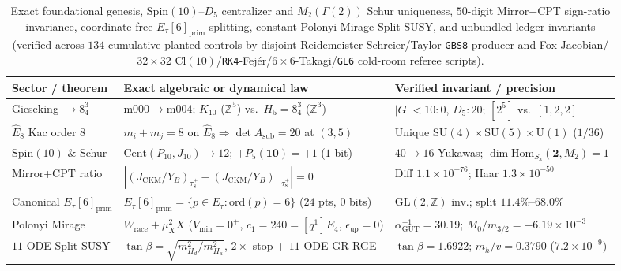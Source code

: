 \documentclass[aps,prd,twocolumn,nofootinbib,floatfix]{revtex4-2}
\begin{document}
\begin{table}[t]
\caption{Exact foundational genesis, $\mathrm{Spin}(10)$--$D_5$ centralizer and $M_2(\Gamma(2))$ Schur uniqueness, $50$-digit Mirror+CPT sign-ratio invariance, coordinate-free $E_\tau[6]_{\mathrm{prim}}$ splitting, constant-Polonyi Mirage Split-SUSY, and unbundled ledger invariants (verified across $134$ cumulative planted controls by disjoint Reidemeister-Schreier/Taylor-\texttt{GBS8} producer and Fox-Jacobian/$32\times 32$ $\mathrm{Cl}(10)$/\texttt{RK4}-Fej\'er/$6\times 6$-Takagi/\texttt{GL6} cold-room referee scripts).}
\label{tab:foundations_link7}
\begin{ruledtabular}
\begin{tabular}{lll}
Sector / theorem & Exact algebraic or dynamical law & Verified invariant / precision \\
\hline
Gieseking $\to 8^3_4$ & $\mathrm{m000}\to\mathrm{m004}$; $K_{10}$ ($\mathbb{Z}^5$) vs.\ $H_5=8^3_4$ ($\mathbb{Z}^3$) & $|G|<10: 0$, $D_5: 20$; $[2^5]$ vs.\ $[1,2,2]$ \\
$\widehat{E}_8$ Kac order $8$ & $m_i + m_j = 8$ on $\widehat{E}_8 \Rightarrow \det A_{\mathrm{sub}} = 20$ at $(3,5)$ & Unique $\mathrm{SU}(4)\times\mathrm{SU}(5)\times\mathrm{U}(1)$ ($1/36$) \\
$\mathrm{Spin}(10)$ \& Schur & $\mathrm{Cent}(P_{10}, J_{10})\to 12$; $+P_5(\mathbf{10})=+1$ ($1$ bit) & $40\to 16$ Yukawas; $\dim\mathrm{Hom}_{S_3}(\mathbf{2},M_2)=1$ \\
Mirror+CPT ratio & $|(J_{\mathrm{CKM}}/Y_B)_{\tau_8^+} - (J_{\mathrm{CKM}}/Y_B)_{-\bar{\tau}_8^+}| = 0$ & Diff $1.1\times 10^{-76}$; Haar $1.3\times 10^{-50}$ \\
Canonical $E_\tau[6]_{\mathrm{prim}}$ & $E_\tau[6]_{\mathrm{prim}} = \{p\in E_\tau : \mathrm{ord}(p)=6\}$ ($24$ pts, $0$ bits) & $\mathrm{GL}(2,\mathbb{Z})$ inv.; split $11.4\%$--$68.0\%$ \\
Polonyi Mirage & $W_{\mathrm{race}} + \mu_X^2 X$ ($V_{\min}=0^+$, $c_1=240=[q^1]E_4$, $\epsilon_{\mathrm{up}}=0$) & $\alpha_{\mathrm{GUT}}^{-1}=30.19$; $M_0/m_{3/2}=-6.19\times 10^{-3}$ \\
$11$-ODE Split-SUSY & $\tan\beta = \sqrt{m_{H_d}^2/m_{H_u}^2}$, $2\times$ stop + $11$-ODE GR RGE & $\tan\beta = 1.6922$; $m_h/v = 0.3790$ ($7.2\times 10^{-9}$) \\
\end{tabular}
\end{ruledtabular}
\end{table}
\end{document}
